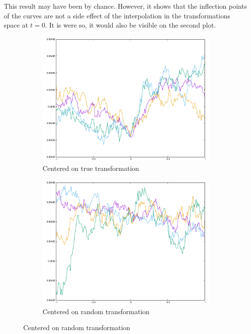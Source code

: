 This result may have been by chance. However, it shows that the inflection points of the curves are not a side effect of the interpolation in the transformations space at $t = 0$. It is were so, it would also be visible on the second plot.

\begin{figure}[H]
\begin{subfigure}{.49\textwidth}
	\includegraphics[width=\linewidth]{fig/ajherr/t3rr/c1.pdf}
	\caption{Centered on true transformation}
\end{subfigure}%
\begin{subfigure}{.49\textwidth}
	\includegraphics[width=\linewidth]{fig/ajherr/t3rr/c2.pdf}
	\caption{Centered on random transformation}
\end{subfigure}
\end{figure}





